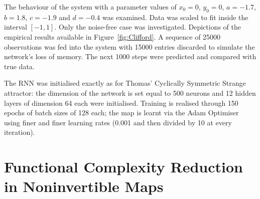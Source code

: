The behaviour of the system with a parameter values of $x_0=0$, $y_0=0$, $a = -1.7$,  $b = 1.8$, $c = -1.9$ and $d = -0.4$ was examined. 
Data was scaled to fit inside the interval $[-1,1]$. Only the noise-free case was investigated. 
Depictions of the empirical results available in Figure~\ref{fig:Clifford}.
 A sequence of 25000 observations was fed into the system with 15000 entries discarded  to simulate the network's loss of memory. The next 1000 steps were predicted and compared with true data.

 The RNN was initialised exactly as for Thomas' Cyclically Symmetric Strange attractor: the dimension of the network is set equal to 500 neurons and 12 hidden layers of dimension 64 each were initialised. Training is realised through 150 epochs of batch sizes of 128 each; the map is learnt via the Adam Optimiser using finer and finer learning rates (0.001 and then divided by 10 at every iteration).

\section{Functional Complexity Reduction in Noninvertible Maps}



